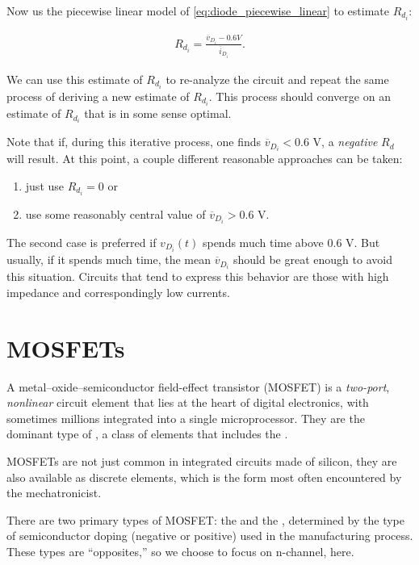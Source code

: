 \documentclass[electronics.tex]{subfiles}
\begin{document}
Now us the piecewise linear model of \cref{eq:diode_piecewise_linear} to estimate $R_{d_i}$:

\begin{align}
  R_{d_i} = \frac{\overline{v}_{D_i}-0.6 V}{\overline{i}_{D_i}}.
\end{align}

We can use this estimate of $R_{d_i}$ to re-analyze the circuit and repeat the same process of deriving a new estimate of $R_{d_i}$.
This process should converge on an estimate of $R_{d_i}$ that is in some sense optimal.

Note that if, during this iterative process, one finds $\overline{v}_{D_i} < 0.6$ V, a \emph{negative} $R_d$ will result.
At this point, a couple different reasonable approaches can be taken:

\begin{enumerate}
  \item just use $R_{d_i} = 0$ or
  \item use some reasonably central value of $\overline{v}_{D_i} > 0.6$ V.
\end{enumerate}

The second case is preferred if $v_{D_i}(t)$ spends much time above $0.6$ V.
But usually, if it spends much time, the mean $\overline{v}_{D_i}$ should be great enough to avoid this situation.
Circuits that tend to express this behavior are those with high impedance and correspondingly low currents.

\section{MOSFETs}
\tags{}

A metal–oxide–semiconductor field-effect transistor (MOSFET) is a \emph{two-port}, \emph{nonlinear} circuit element that lies at the heart of digital electronics, with sometimes millions integrated into a single microprocessor.
They are the dominant type of , a class of elements that includes the .
\tags{}

MOSFETs are not just common in integrated circuits made of silicon, they are also available as discrete elements, which is the form most often encountered by the mechatronicist.
\tags{}

There are two primary types of MOSFET: the  and the , determined by the type of semiconductor doping (negative or positive) used in the manufacturing process.
These types are ``opposites,'' so we choose to focus on n-channel, here.
\tags{}
\end{document}
